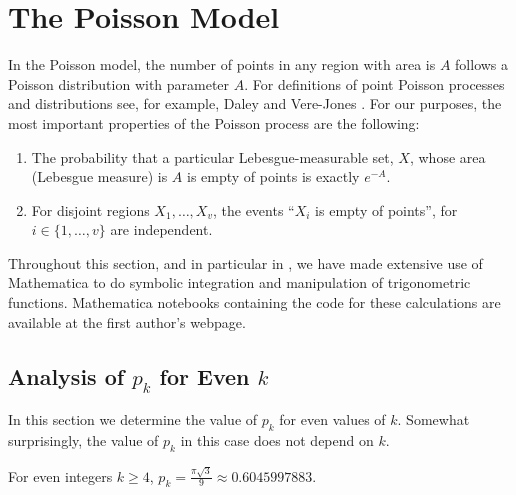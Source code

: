 \documentclass{patmorin}
\begin{document}
\section{The Poisson Model}

In the Poisson model, the number of points in any region with area is $A$
follows a Poisson distribution with parameter $A$.  For definitions of
point Poisson processes and distributions see, for example, Daley and
Vere-Jones \cite[Chapter~2]{daley.vere-jones:introduction}.  For our
purposes, the most important properties of the Poisson process are
the following:
\begin{enumerate}
\item The probability that a particular Lebesgue-measurable set, $X$,
   whose area (Lebesgue measure) is $A$ is empty of points is exactly
   $e^{-A}$.
\item For disjoint regions $X_1,\ldots,X_v$, the events ``$X_i$ is empty
   of points'', for $i\in\{1,\ldots,v\}$ are independent.
\end{enumerate}

Throughout this section, and in particular in , we have made
extensive use of Mathematica to do symbolic integration and manipulation
of trigonometric functions.  Mathematica notebooks containing the code
for these calculations are available at the first author's webpage.

\subsection{Analysis of $p_k$ for Even $k$}

In this section we determine the value of $p_k$ for even values of $k$.
Somewhat surprisingly, the value of $p_k$ in this case does not depend on $k$.

\begin{lem}
 For even integers $k\ge 4$, $p_k=\frac{\pi\sqrt{3}}{9}\approx 0.6045997883$.
\end{lem}
\end{document}
